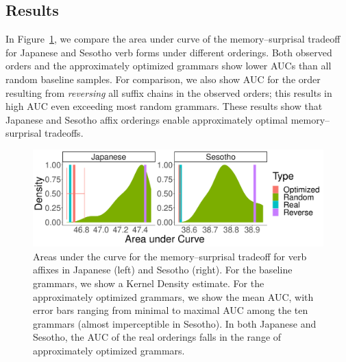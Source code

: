 \subsection{Results}
In Figure~\ref{fig:morph-auc}, we compare the area under curve of the memory--surprisal tradeoff for Japanese and Sesotho verb forms under different orderings.
Both observed orders and the approximately optimized grammars show lower AUCs than all random baseline samples.
For comparison, we also show AUC for the order resulting from \emph{reversing} all suffix chains in the observed orders; this results in high AUC even exceeding most random grammars.
These results show that Japanese and Sesotho affix orderings enable approximately optimal memory--surprisal tradeoffs.



\begin{figure}
	\begin{center}
\includegraphics[width=\textwidth]{figures/Both-suffixes-byMorphemes-auc-hist-heldout.pdf}
\end{center}
	\caption{Areas under the curve for the memory--surprisal tradeoff for verb affixes in Japanese (left) and Sesotho (right). For the baseline grammars, we show a Kernel Density estimate.
	For the approximately optimized grammars, we show the mean AUC, with error bars ranging from minimal to maximal AUC among the ten grammars (almost imperceptible in Sesotho).
	In both Japanese and Sesotho, the AUC of the real orderings falls in the range of approximately optimized grammars.}
	\label{fig:morph-auc}
\end{figure}



%


